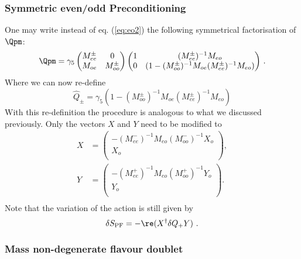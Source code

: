 \subsubsection{Symmetric even/odd Preconditioning}

One may write instead of eq. (\ref{eq:eo2}) the following symmetrical
factorisation of $\Qpm$:
\begin{equation}
  \label{eq:sym1}
  \Qpm =
  \gamma_5\begin{pmatrix}
    M_{ee}^\pm & 0 \\
    M_{oe}  &  M_{oo}^\pm \\
  \end{pmatrix}
  \begin{pmatrix}
    1       & (M_{ee}^\pm)^{-1}M_{eo}\\
    0       & (1-(M_{oo}^\pm)^{-1} M_{oe} (M_{ee}^\pm)^{-1} M_{eo})\\
  \end{pmatrix}\, .
\end{equation}
Where we can now re-define
\begin{equation}
  \label{eq:sym2}
  \hat Q_\pm = \gamma_5(1-(M_{oo}^\pm)^{-1} M_{oe} (M_{ee}^\pm)^{-1}
  M_{eo}) 
\end{equation}
With this re-definition the procedure is analogous to what we
discussed previously. Only the vectors $X$ and $Y$ need to be modified
to  
\begin{equation}
  \begin{split}
    \label{eq:eo9}
    X &= 
    \begin{pmatrix}
      -(M_{ee}^-)^{-1}M_{eo}(M_{oo}^-)^{-1}X_o \\ X_o\\
    \end{pmatrix},\\
    Y &= 
    \begin{pmatrix}
      -(M_{ee}^+)^{-1}M_{eo}(M_{oo}^+)^{-1}Y_o \\ Y_o\\
    \end{pmatrix}.\\
  \end{split}
\end{equation}
Note that the variation of the action is still given by
\begin{equation}
  \label{eq:sym3}
  \delta S_\mathrm{PF} = -\re(X^\dagger \delta Q_+ Y)\ .
\end{equation}

\subsubsection{Mass non-degenerate flavour doublet}

